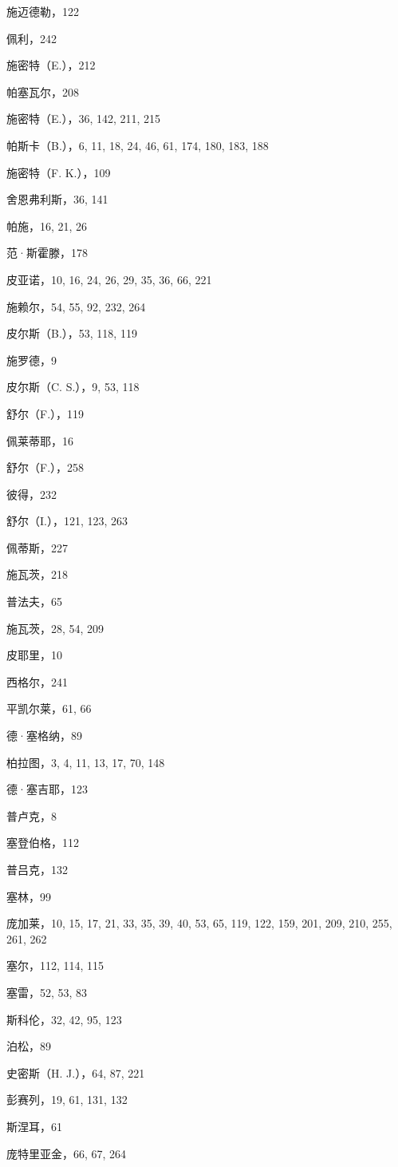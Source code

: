 施迈德勒，122

佩利，242

施密特（E.），212

帕塞瓦尔，208

施密特（E.），36, 142, 211, 215

帕斯卡（B.），6, 11, 18, 24, 46, 61, 174, 180, 183, 188

施密特（F. K.），109

舍恩弗利斯，36, 141

帕施，16, 21, 26

范·斯霍滕，178

皮亚诺，10, 16, 24, 26, 29, 35, 36, 66, 221

施赖尔，54, 55, 92, 232, 264

皮尔斯（B.），53, 118, 119

施罗德，9

皮尔斯（C. S.），9, 53, 118

舒尔（F.），119

佩莱蒂耶，16

舒尔（F.），258

彼得，232

舒尔（I.），121, 123, 263

佩蒂斯，227

施瓦茨，218

普法夫，65

施瓦茨，28, 54, 209

皮耶里，10

西格尔，241

平凯尔莱，61, 66

德·塞格纳，89

柏拉图，3, 4, 11, 13, 17, 70, 148

德·塞吉耶，123

普卢克，8

塞登伯格，112

普吕克，132

塞林，99

庞加莱，10, 15, 17, 21, 33, 35, 39, 40, 53, 65, 119, 122, 159, 201, 209, 210, 255, 261, 262

塞尔，112, 114, 115

塞雷，52, 53, 83

斯科伦，32, 42, 95, 123

泊松，89

史密斯（H. J.），64, 87, 221

彭赛列，19, 61, 131, 132

斯涅耳，61

庞特里亚金，66, 67, 264

